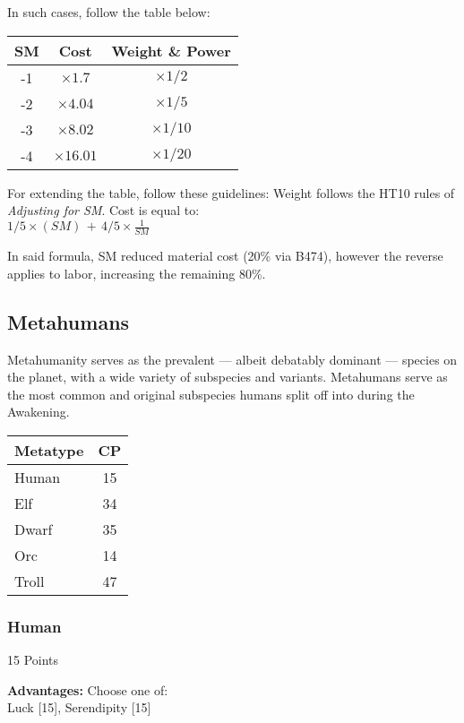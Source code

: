 \begin{multicols*}{3}
	In such cases, follow the table below:
	
	\begin{center}
		\begin{tabular}{|c|c|c|}
			\hline
			SM & Cost & Weight \& Power \\
			\hline
			\hline
			-1 & $\times1.7$ & $\times1/2$ \\
			-2 & $\times4.04$ & $\times1/5$ \\
			-3 & $\times8.02$ & $\times1/10$ \\
			-4 & $\times16.01$ & $\times1/20$ \\
			\hline
		\end{tabular}
	\end{center}

	\begin{center}
		For extending the table, follow these guidelines: Weight follows the HT10 rules of \textit{Adjusting for SM}. Cost is equal to:\\ $1/5\times(SM)\,+\,4/5\times\frac{1}{SM}$
	\end{center}
	
	In said formula, SM reduced material cost (20\% via B474), however the reverse applies to labor, increasing the remaining 80\%.
	
	\subsection{Metahumans}
	
	Metahumanity serves as the prevalent — albeit debatably dominant — species on the planet, with a wide variety of subspecies and variants. Metahumans serve as the most common and original subspecies humans split off into during the Awakening.
	
	\begin{center}
		\begin{tabularx}{0.32\textwidth}{|X|c|}
			\hline
			Metatype & CP \\
			\hline
			\hline
			Human & 15 \\
			Elf & 34 \\
			Dwarf & 35 \\
			Orc & 14 \\
			Troll & 47 \\
			\hline
		\end{tabularx}
	\end{center}
	
	\subsubsection*{Human}
	\begin{flushright}
		15 Points
	\end{flushright}
	\textbf{Advantages:} 
	Choose one of: \\
	Luck [15], Serendipity [15]
	

\end{multicols*}
